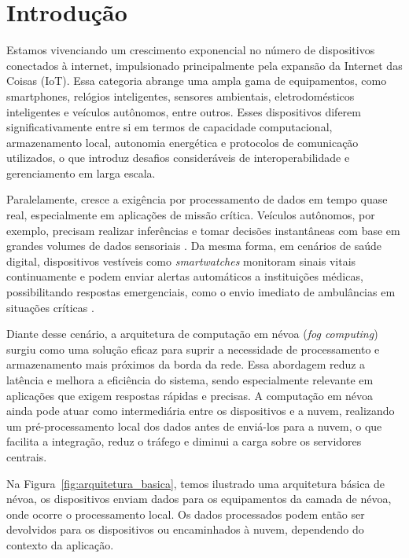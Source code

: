 \chapter{Introdução}

Estamos vivenciando um crescimento exponencial no número de dispositivos conectados à internet, impulsionado principalmente pela expansão da Internet das Coisas (IoT). Essa categoria abrange uma ampla gama de equipamentos, como smartphones, relógios inteligentes, sensores ambientais, eletrodomésticos inteligentes e veículos autônomos, entre outros. Esses dispositivos diferem significativamente entre si em termos de capacidade computacional, armazenamento local, autonomia energética e protocolos de comunicação utilizados, o que introduz desafios consideráveis de interoperabilidade e gerenciamento em larga escala.

Paralelamente, cresce a exigência por processamento de dados em tempo quase real, especialmente em aplicações de missão crítica. Veículos autônomos, por exemplo, precisam realizar inferências e tomar decisões instantâneas com base em grandes volumes de dados sensoriais \cite{markakis2017}. Da mesma forma, em cenários de saúde digital, dispositivos vestíveis como \textit{smartwatches} monitoram sinais vitais continuamente e podem enviar alertas automáticos a instituições médicas, possibilitando respostas emergenciais, como o envio imediato de ambulâncias em situações críticas \cite{cassel2024}.

Diante desse cenário, a arquitetura de computação em névoa (\textit{fog computing}) surgiu como uma solução eficaz para suprir a necessidade de processamento e armazenamento mais próximos da borda da rede. Essa abordagem reduz a latência e melhora a eficiência do sistema, sendo especialmente relevante em aplicações que exigem respostas rápidas e precisas. A computação em névoa ainda pode atuar como intermediária entre os dispositivos e a nuvem, realizando um pré-processamento local dos dados antes de enviá-los para a nuvem, o que facilita a integração, reduz o tráfego e diminui a carga sobre os servidores centrais.

Na Figura~\ref{fig:arquitetura_basica}, temos ilustrado uma arquitetura básica de névoa, os dispositivos enviam dados para os equipamentos da camada de névoa, onde ocorre o processamento local. Os dados processados podem então ser devolvidos para os dispositivos ou encaminhados à nuvem, dependendo do contexto da aplicação.

